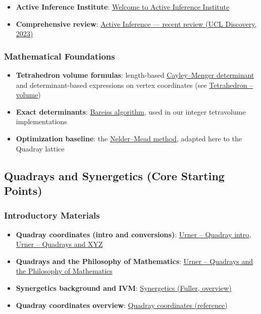 \documentclass[
  10pt,
]{article}
\providecommand{\tightlist}{%
  \setlength{\itemsep}{0pt}\setlength{\parskip}{0pt}}
\begin{document}
\begin{itemize}
\tightlist
\item
  \textbf{Active Inference Institute}:
  \href{https://welcome.activeinference.institute/}{Welcome to Active
  Inference Institute}
\item
  \textbf{Comprehensive review}:
  \href{https://discovery.ucl.ac.uk/id/eprint/10176959/1/1-s2.0-S1571064523001094-main.pdf}{Active
  Inference --- recent review (UCL Discovery, 2023)}
\end{itemize}

\subsubsection{Mathematical
Foundations}\label{mathematical-foundations-1}

\begin{itemize}
\tightlist
\item
  \textbf{Tetrahedron volume formulas}: length-based
  \href{https://en.wikipedia.org/wiki/Cayley\%E2\%80\%93Menger_determinant}{Cayley--Menger
  determinant} and determinant-based expressions on vertex coordinates
  (see
  \href{https://en.wikipedia.org/wiki/Tetrahedron\#Volume}{Tetrahedron
  -- volume})
\item
  \textbf{Exact determinants}:
  \href{https://en.wikipedia.org/wiki/Bareiss_algorithm}{Bareiss
  algorithm}, used in our integer tetravolume implementations
\item
  \textbf{Optimization baseline}: the
  \href{https://en.wikipedia.org/wiki/Nelder\%E2\%80\%93Mead_method}{Nelder--Mead
  method}, adapted here to the Quadray lattice
\end{itemize}

\subsection{Quadrays and Synergetics (Core Starting
Points)}\label{quadrays-and-synergetics-core-starting-points}

\subsubsection{Introductory Materials}\label{introductory-materials}

\begin{itemize}
\tightlist
\item
  \textbf{Quadray coordinates (intro and conversions)}:
  \href{https://www.grunch.net/synergetics/quadintro.html}{Urner --
  Quadray intro},
  \href{https://www.grunch.net/synergetics/quadxyz.html}{Urner --
  Quadrays and XYZ}
\item
  \textbf{Quadrays and the Philosophy of Mathematics}:
  \href{https://www.grunch.net/synergetics/quadphil.html}{Urner --
  Quadrays and the Philosophy of Mathematics}
\item
  \textbf{Synergetics background and IVM}:
  \href{https://en.wikipedia.org/wiki/Synergetics_(Fuller)}{Synergetics
  (Fuller, overview)}
\item
  \textbf{Quadray coordinates overview}:
  \href{https://en.wikipedia.org/wiki/Quadray_coordinates}{Quadray
  coordinates (reference)}
\end{itemize}
\end{document}
